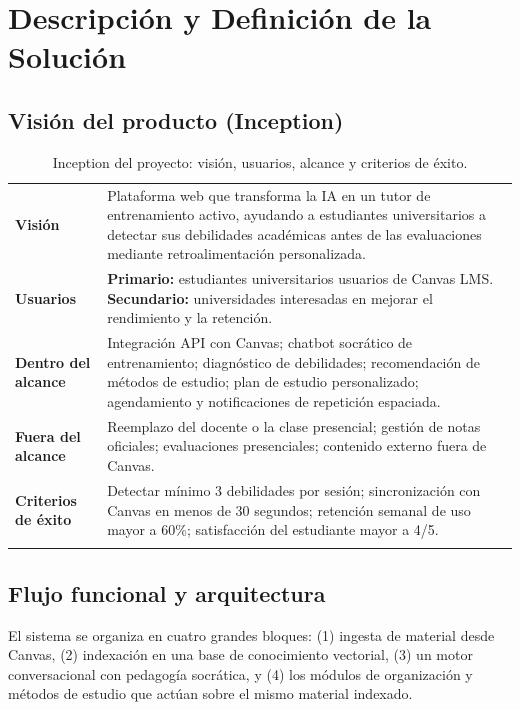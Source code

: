 \documentclass[11pt,a4paper]{article}
\begin{document}
\section{Descripci\'on y Definici\'on de la Soluci\'on}

\subsection{Visi\'on del producto (Inception)}

\begin{longtable}{@{}>{\bfseries}p{3.8cm} p{10.7cm}@{}}
\toprule
Visi\'on & Plataforma web que transforma la IA en un tutor de entrenamiento activo, ayudando a estudiantes universitarios a detectar sus debilidades acad\'emicas antes de las evaluaciones mediante retroalimentaci\'on personalizada. \\
Usuarios & \textbf{Primario:} estudiantes universitarios usuarios de Canvas LMS. \textbf{Secundario:} universidades interesadas en mejorar el rendimiento y la retenci\'on. \\
Dentro del alcance & Integraci\'on API con Canvas; chatbot socr\'atico de entrenamiento; diagn\'ostico de debilidades; recomendaci\'on de m\'etodos de estudio; plan de estudio personalizado; agendamiento y notificaciones de repetici\'on espaciada. \\
Fuera del alcance & Reemplazo del docente o la clase presencial; gesti\'on de notas oficiales; evaluaciones presenciales; contenido externo fuera de Canvas. \\
Criterios de \'exito & Detectar m\'inimo 3 debilidades por sesi\'on; sincronizaci\'on con Canvas en menos de 30 segundos; retenci\'on semanal de uso mayor a 60\%; satisfacci\'on del estudiante mayor a 4/5. \\
\bottomrule
\caption{Inception del proyecto: visi\'on, usuarios, alcance y criterios de \'exito.}
\end{longtable}

\subsection{Flujo funcional y arquitectura}

El sistema se organiza en cuatro grandes bloques: (1) ingesta de material desde Canvas, (2) indexaci\'on en una base de conocimiento vectorial, (3) un motor conversacional con pedagog\'ia socr\'atica, y (4) los m\'odulos de organizaci\'on y m\'etodos de estudio que act\'uan sobre el mismo material indexado.
\end{document}

